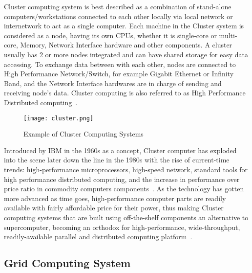 Cluster computing system is best described as a combination of stand-alone computers/workstations connected to each other locally via local network or internetwork to act as a single computer. Each machine in the Cluster system is considered as a node, having its own CPUs, whether it is single-core or multi-core, Memory, Network Interface hardware and other components. A cluster usually has 2 or more nodes integrated and can have shared storage for easy data accessing. To exchange data between with each other, nodes are connected to High Performance Network/Switch, for example Gigabit Ethernet or Infinity Band, and the Network Interface hardwares are in charge of sending and receiving node's data. Cluster computing is also referred to as High Performance Distributed computing~\cite{intro_cluster}. \\
\begin{figure}[H]
\texttt{[image: cluster.png]}
\centering
\caption{Example of Cluster Computing Systems}
\end{figure}
Introduced by IBM in the 1960s as a concept, Cluster computer has exploded into the scene later down the line in the 1980s with the rise of current-time trends: high-performance microprocessors, high-speed network, standard tools for high performance distributed computing, and the increase in performance over price ratio in commodity computers components~\cite{ic_cluster}. As the technology has gotten more advanced as time goes, high-performance computer parts are readily available with fairly affordable price for their power, thus making Cluster computing systems that are built using off-the-shelf components an alternative to supercomputer, becoming an orthodox for high-performance, wide-throughput, readily-available parallel and distributed computing platform~\cite{intro_cluster}. \\

\subsection{Grid Computing System}

